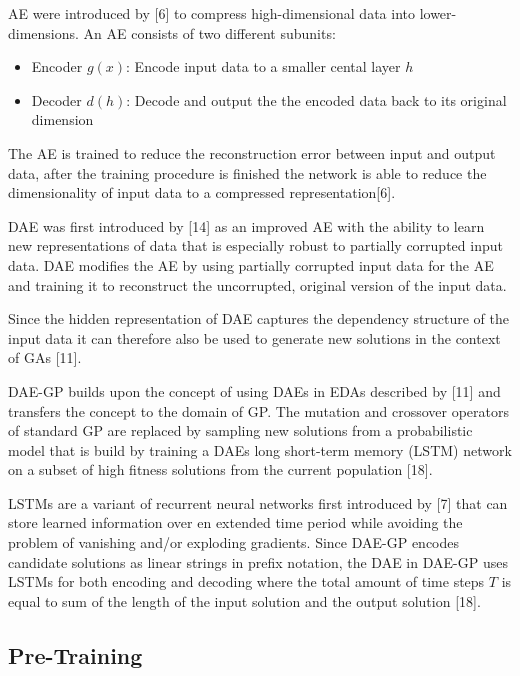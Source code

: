 \documentclass[
  11pt,
]{article}
\providecommand{\tightlist}{%
  \setlength{\itemsep}{0pt}\setlength{\parskip}{0pt}}
\begin{document}
AE were introduced by {[}6{]} to compress high-dimensional data into
lower-dimensions. An AE consists of two different subunits:

\begin{itemize}
\tightlist
\item
  Encoder \(g(x)\): Encode input data to a smaller cental layer \(h\)
\item
  Decoder \(d(h)\): Decode and output the the encoded data back to its
  original dimension
\end{itemize}

The AE is trained to reduce the reconstruction error between input and
output data, after the training procedure is finished the network is
able to reduce the dimensionality of input data to a compressed
representation{[}6{]}.

DAE was first introduced by {[}14{]} as an improved AE with the ability
to learn new representations of data that is especially robust to
partially corrupted input data. DAE modifies the AE by using partially
corrupted input data for the AE and training it to reconstruct the
uncorrupted, original version of the input data.

Since the hidden representation of DAE captures the dependency structure
of the input data it can therefore also be used to generate new
solutions in the context of GAs {[}11{]}.

DAE-GP builds upon the concept of using DAEs in EDAs described by
{[}11{]} and transfers the concept to the domain of GP. The mutation and
crossover operators of standard GP are replaced by sampling new
solutions from a probabilistic model that is build by training a DAEs
long short-term memory (LSTM) network on a subset of high fitness
solutions from the current population {[}18{]}.

LSTMs are a variant of recurrent neural networks first introduced by
{[}7{]} that can store learned information over en extended time period
while avoiding the problem of vanishing and/or exploding gradients.
Since DAE-GP encodes candidate solutions as linear strings in prefix
notation, the DAE in DAE-GP uses LSTMs for both encoding and decoding
where the total amount of time steps \(T\) is equal to sum of the length
of the input solution and the output solution {[}18{]}.

\hypertarget{pre-training}{%
\subsection{Pre-Training}\label{pre-training}}
\end{document}
